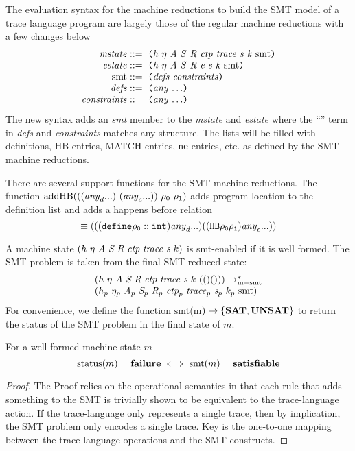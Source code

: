 The evaluation syntax for the machine reductions to build the SMT
model of a trace language program are largely those of the regular machine
reductions with a few changes below
\[
\cfgstart
\cfgrule{mstate}{\lp\cfgnt{h}\ \cfgnt{\ensuremath{\eta}}\ \cfgnt{\aidmap}\  
  \cfgnt{\epsnd}\ \cfgnt{\eprcv}\ \cfgnt{ctp}\ \cfgnt{\trace}\ \cfgnt{\status}\ \cfgnt{k}\ \smt\rp}
\cfgrule{estate}{\lp\cfgnt{h}\ \cfgnt{\ensuremath{\eta}}\ \cfgnt{\aidmap}\  
  \cfgnt{\epsnd}\ \cfgnt{\eprcv}\ \cfgnt{e}\ \cfgnt{\status}\ \cfgnt{k}\ \smt\rp}
\cfgrule{\smt}{\lp\cfgnt{defs}~\cfgnt{constraints}\rp}
\cfgrule{defs}{\lp\cfgnt{any}~$\ldots$\rp}
\cfgrule{constraints}{\lp\cfgnt{any}~$\ldots$\rp}
\cfgend
\]
The new syntax adds an \textit{smt} member to the \textit{mstate}
and \textit{estate} where the ``'' term in \textit{defs}
and \textit{constraints} matches any structure.  The lists will
be filled with definitions, HB entries, MATCH entries, \texttt{ne}
entries, etc. as defined by the SMT machine reductions.

There are several support functions for the SMT machine reductions.  The function $\mathrm{addHB}(((\mathit{any}_d ...)\ (\mathit{any}_c ...))\ \rho_0\ \rho_1)$ adds program location to the definition list and adds a happens before relation
\[
 \equiv \\
   (((\mathtt{define \rho_0 :: int}) \mathit{any}_d ...)((\mathtt{HB \rho_0 \rho_1}) \mathit{any}_c ...))
\]

\begin{definition}
A machine state $(h\ \eta\ \textit{A}\ \textit{S}\ \textit{R}\ \emph{ctp}\ \mathit{trace}\ \textit{s}\ k)$ is smt-enabled if it is well formed.  The SMT problem is taken from the final SMT reduced state:
\[\begin{array}{l}
        (h\ \eta\ \textit{A}\ \textit{S}\ \textit{R}\ \emph{ctp}\ \mathit{trace}\ \textit{s}\ k\ (()()))  \rightarrow_{\mathrm{m-smt}}^{*} \\
 (h_p\ \eta_p\ \textit{A}_p\ \textit{S}_p\ \textit{R}_p\ \emph{ctp}_p\ \mathit{trace}_p\ \textit{s}_p\ k_p\ \mathrm{smt}) 
 \end{array}\]  
For convenience, we define the function
$\mathrm{smt}($m$) \mapsto \{\textbf{SAT},\textbf{UNSAT}\}$
to return the status of the SMT problem in the final state of $m$.
\end{definition}

\begin{lemma}
For a well-formed machine state $m$
\[
\mathrm{status}(m) = \textbf{failure} \iff \mathrm{smt}(m) = \textbf{satisfiable}
\]
\end{lemma}
\begin{proof}
The Proof relies on the operational semantics in that each rule that adds
something to the SMT is trivially shown to be equivalent to the
trace-language action.  If the trace-language only represents a single
trace, then by implication, the SMT problem only encodes a single
trace.  Key is the one-to-one mapping between the trace-language
operations and the SMT constructs.
\end{proof}

